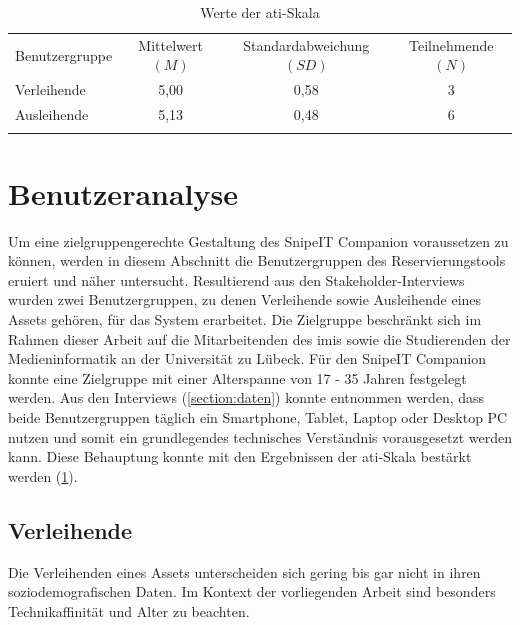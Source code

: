\begin{table}[h]
        \centering
        \caption{Werte der \ac{ati}-Skala}
        \begin{tabular}{lccc}
                \arrayrulecolor{maincolor}\arrayrulecolor{maincolor}\hline
                \sffamily\color{maincolor}Benutzergruppe & \sffamily\color{maincolor}Mittelwert
                $(M)$& \sffamily\color{maincolor}Standardabweichung $(SD)$ &
                \sffamily\color{maincolor}Teilnehmende $(N)$ \\
                \arrayrulecolor{maincolor}\arrayrulecolor{maincolor}\hline
                Verleihende & 5,00                                 & 0,58 & 3\\
                Ausleihende & 5,13                                 & 0,48 & 6\\
                \arrayrulecolor{maincolor}\arrayrulecolor{maincolor}\hline
        \end{tabular}
        \label{table:ati}
\end{table}

\section{Benutzeranalyse}
\label{section:benutzer}
Um eine zielgruppengerechte Gestaltung des SnipeIT Companion voraussetzen zu können, werden in
diesem Abschnitt die Benutzergruppen des Reservierungstools eruiert und näher untersucht.
Resultierend aus den Stakeholder-Interviews wurden zwei Benutzergruppen, zu denen Verleihende sowie
Ausleihende eines Assets gehören, für das System erarbeitet. Die Zielgruppe beschränkt sich im
Rahmen dieser Arbeit auf die Mitarbeitenden des \ac{imis} sowie die Studierenden der
Medieninformatik an der Universität zu Lübeck. Für den SnipeIT Companion konnte eine Zielgruppe mit
einer Alterspanne von 17 - 35 Jahren festgelegt werden. Aus den Interviews (\ref{section:daten})
konnte entnommen werden, dass beide Benutzergruppen täglich ein Smartphone, Tablet, Laptop oder
Desktop PC nutzen und somit ein grundlegendes technisches Verständnis vorausgesetzt werden kann.
Diese Behauptung konnte mit den Ergebnissen der \ac{ati}-Skala bestärkt werden (\ref{table:ati}). 


\subsection{Verleihende}
Die Verleihenden eines Assets unterscheiden sich gering bis gar nicht in ihren soziodemografischen
Daten. Im Kontext der vorliegenden Arbeit sind besonders Technikaffinität und Alter zu beachten.

